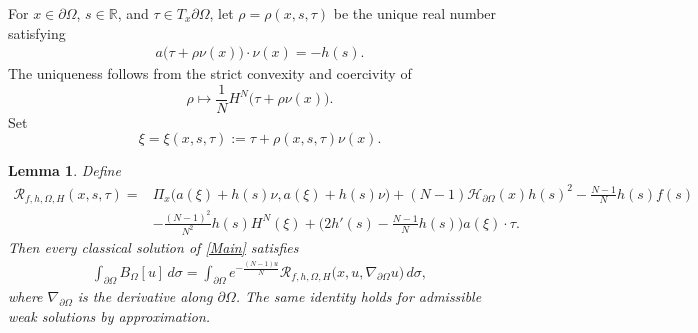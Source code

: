 \documentclass[reqno, 11pt]{amsart} %
\numberwithin{equation}{section}
\newtheorem{lemma}[thm]{Lemma}
\theoremstyle{definition}
\newcommand{\pa}{\partial}
\newcommand{\R}{\mathbb{R}}
\begin{document}
For $x\in\partial\Omega$, $s\in\R$, and $\tau\in T_x\partial\Omega$, let $\rho=\rho(x,s,\tau)$ be the
unique real number satisfying
\begin{align}\label{rho-eq}
    a\bigl(\tau+\rho\nu(x)\bigr)\cdot\nu(x)=-h(s).
\end{align}
The uniqueness follows from the strict convexity and coercivity of
\[
    \rho\longmapsto\frac1N H^N\bigl(\tau+\rho\nu(x)\bigr).
\]
Set
\[
    \xi=\xi(x,s,\tau):=\tau+\rho(x,s,\tau)\nu(x).
\]

\begin{lemma}\label{lem:boundary-reduction}
Define
\begin{align}\label{R-density}
    \mathcal R_{f,h,\Omega,H}(x,s,\tau) = & \Pi_x\bigl(a(\xi)+h(s)\nu,a(\xi)+h(s)\nu\bigr) +(N-1) \mathcal{H}_{\pa \Omega}(x)h(s)^2 -\frac{N-1}{N} h(s)f(s) \nonumber\\
    &-\frac{(N-1)^2}{N^2}h(s)H^N(\xi) +\bigg(2h'(s)- \frac{N-1}{N} h(s)\bigg)a(\xi)\cdot\tau .
\end{align}
Then every classical solution of \eqref{Main} satisfies
\begin{align}\label{eq:int-reduction}
    \int_{\partial\Omega}B_\Omega[u]\,d\sigma = \int_{\partial\Omega}e^{- \frac{(N-1)u}{N}} \mathcal R_{f,h,\Omega,H} \bigl(x,u,\nabla_{\pa \Omega} u\bigr)\,d\sigma,
\end{align}
where $\nabla_{\pa \Omega}$ is the derivative along $\pa \Omega$. The same identity holds for admissible weak solutions by
approximation.
\end{lemma}
\end{document}
